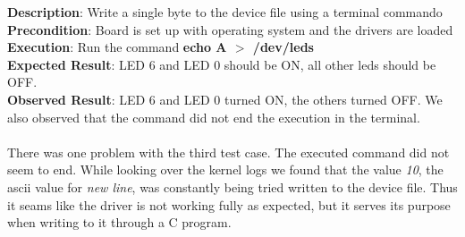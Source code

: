 {\bf Description}: Write a single byte to the device file using a terminal commando\\
{\bf Precondition}: Board is set up with operating system and the drivers are loaded\\
{\bf Execution}: Run the command {\bf echo A $>$ /dev/leds} \\
{\bf Expected Result}: LED 6 and LED 0 should be ON, all other leds should be OFF.\\
{\bf Observed Result}: LED 6 and LED 0 turned ON, the others turned OFF. We also
observed that the command did not end the execution in the terminal.\\
 \\
There was one problem with the third test case. The executed command did not seem to end.
While looking over the kernel logs we found that the value {\it 10}, the ascii value for
{\it new line}, was constantly being tried written to the device file. Thus it seams like
the driver is not working fully as expected, but it serves its purpose when writing to it
through a C program.
